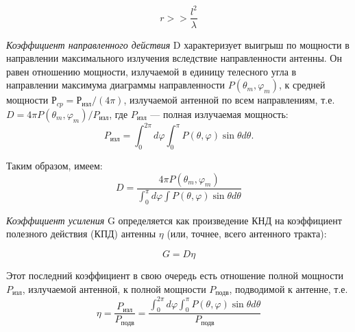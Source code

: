 \begin{equation}
    r>>\frac{l^2}{\lambda}
    \label{eq:1}
\end{equation}

\textit{Коэффициент направленного действия} D характеризует
выигрыш по  мощности в направлении максимального излучения вследствие направленности антенны. Он равен отношению 
мощности, излучаемой в единицу телесного угла в направлении максимума диаграммы направленности $P(\theta_m,\varphi_m)$, к средней 
мощности $Р_{cp} = Р_{\text{изл}} /(4\pi)$, излучаемой антенной по всем направлениям, т.е. $ D=4 \pi
P\left(\theta_{m}, \varphi_{m}\right) / P_{\text{изл}} $, где $P_{\text{изл}} $ — полная излучаемая мощность:
$$  P_{\text{изл}} = \int_0^{2\pi}d\varphi \int_0^\pi P( \theta,\varphi ) \sin{\theta}d \theta. $$

Таким образом, имеем:
\begin{equation}
    D=\frac{4 \pi P\left(\theta_{m}, \varphi_{m}\right)}{\int_{0}^{\pi} d \varphi \int P(\theta, \varphi) \sin \theta d \theta}
    \label{eq:2}    
\end{equation}



\textit{Коэффициент усиления} G определяется как произведение КНД на коэффициент полезного действия (КПД) антенны $\eta$
(или, точнее, всего антенного тракта):

\begin{equation}
    G = D\eta
    \label{eq:3}    
\end{equation}

Этот последний коэффициент в свою очередь есть отношение полной мощности $P_{\text{изл}}$, излучаемой антенной, к полной
мощности $P_{\text{подв}}$, подводимой к антенне, т.е.
\begin{equation}
    \eta =\frac{P_{\text{изл}}}{P_{\text{подв}}} = \frac{\int_{0}^{2 \pi} d \varphi \int_{0}^{\pi} P(\theta, \varphi) \sin \theta d \theta}{P_{\text{подв}}}
    \label{eq:4}    
\end{equation}

